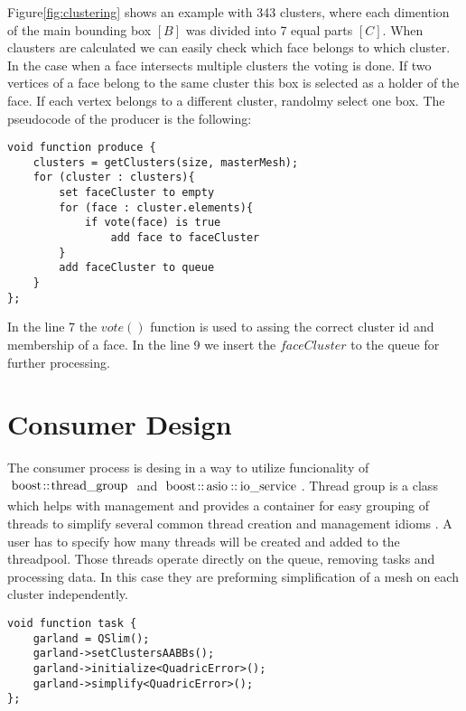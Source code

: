 Figure\ref{fig:clustering} shows an example with 343 clusters, where each dimention of the main bounding box $[B]$ was divided into 7 equal parts $[C]$. When clausters are calculated we can easily check which face belongs to which cluster. In the case when a face intersects multiple clusters the voting is done. If two vertices of a face belong to the same cluster this box is selected as a holder of the face. If each vertex belongs to a different cluster, randolmy select one box. The pseudocode of the producer is the following:
\newline
\begin{center}
\begin{lstlisting}[caption={C style psuedocode of a producer},captionpos=b]
void function produce {
    clusters = getClusters(size, masterMesh);
    for (cluster : clusters){
        set faceCluster to empty
        for (face : cluster.elements){
            if vote(face) is true
                add face to faceCluster
        }
        add faceCluster to queue
    }
};
\end{lstlisting}
\end{center}

In the line 7 the $vote()$ function is used to assing the correct cluster id and membership of a face. In the line 9 we insert the $faceCluster$ to the queue for further processing.

\newpage
\section{Consumer Design}

The consumer process is desing in a way to utilize funcionality of $\inlinecode{Java}{boost::thread_group}$ and $\inlinecode{Java}{boost::asio::io_service}$. Thread group is a class which helps with management and provides a container for easy grouping of threads to simplify several common thread creation and management idioms \cite{boost03}. A user has to specify how many threads will be created and added to the threadpool. Those threads operate directly on the queue, removing tasks and processing data. In this case they are preforming simplification of a mesh on each cluster independently.
\newline
\begin{center}
\begin{lstlisting}[caption={C style psuedocode of a task for a consumer},captionpos=b]
void function task {
    garland = QSlim();
    garland->setClustersAABBs();
    garland->initialize<QuadricError>();
    garland->simplify<QuadricError>();
};
\end{lstlisting}
\end{center}

